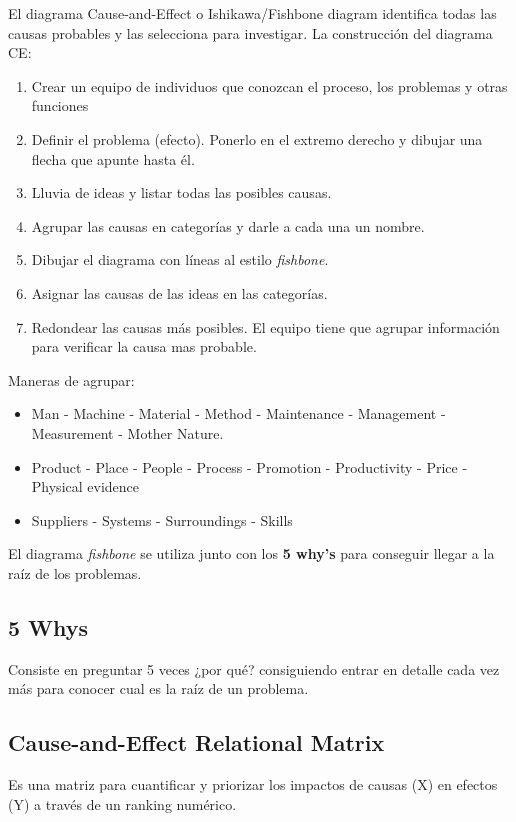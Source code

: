 \documentclass[oneside]{book}
\begin{document}
El diagrama Cause-and-Effect o Ishikawa/Fishbone diagram identifica todas las causas probables y las selecciona para investigar. La construcción del diagrama CE:
\begin{enumerate}
	\item Crear un equipo de individuos que conozcan el proceso, los problemas y otras funciones
	\item Definir el problema (efecto). Ponerlo en el extremo derecho y dibujar una flecha que apunte hasta él.
	\item Lluvia de ideas y listar todas las posibles causas.
	\item Agrupar las causas en categorías y darle a cada una un nombre.
	\item Dibujar el diagrama con líneas al estilo \textit{fishbone}.
	\item Asignar las causas de las ideas en las categorías.
	\item Redondear las causas más posibles. El equipo tiene que agrupar información para verificar la causa mas probable.
\end{enumerate}
Maneras de agrupar: \begin{itemize}
	\item Man - Machine - Material - Method - Maintenance - Management - Measurement - Mother Nature.
	\item Product - Place - People - Process - Promotion - Productivity - Price - Physical evidence
	\item Suppliers - Systems - Surroundings - Skills
\end{itemize}
El diagrama \textit{fishbone} se utiliza junto con los \textbf{5 why's} para conseguir llegar a la raíz de los problemas.

\subsection{5 Whys}
Consiste en preguntar 5 veces ¿por qué? consiguiendo entrar en detalle cada vez más para conocer cual es la raíz de un problema.

\subsection{Cause-and-Effect Relational Matrix}
Es una matriz para cuantificar y priorizar los impactos de causas (X) en efectos (Y) a través de un ranking numérico. 
\end{document}
